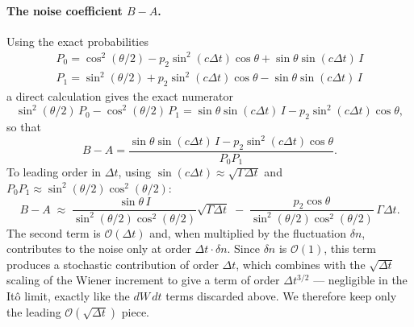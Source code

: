 \documentclass[a4paper,12pt]{article}
\begin{document}
\paragraph{The noise coefficient $B-A$.}
Using the exact probabilities
\begin{gather*}
	P_{0} = \cos^{2}(\theta/2) - p_{2}\sin^{2}(c\Delta t)\cos\theta + \sin\theta\sin(c\Delta t)\, I \\
	P_{1} = \sin^{2}(\theta/2) + p_{2}\sin^{2}(c\Delta t)\cos\theta - \sin\theta\sin(c\Delta t)\, I
\end{gather*}
a direct calculation gives the exact numerator
\begin{equation}
	\sin^{2}(\theta/2)\,P_{0} - \cos^{2}(\theta/2)\,P_{1} = \sin\theta\sin(c\Delta t)\, I - p_{2}\sin^{2}(c\Delta t)\cos\theta ,
\end{equation}
so that
\begin{equation}
	B - A = \frac{\sin\theta\sin(c\Delta t)\, I - p_{2}\sin^{2}(c\Delta t)\cos\theta}{P_{0}P_{1}} .
\end{equation}
To leading order in $\Delta t$, using $\sin(c\Delta t)\approx\sqrt{\Gamma\Delta t}$ and $P_{0}P_{1}\approx \sin^{2}(\theta/2)\cos^{2}(\theta/2)$:
\begin{equation}
	B - A \;\approx\; \frac{\sin\theta\, I}{\sin^{2}(\theta/2)\cos^{2}(\theta/2)}\sqrt{\Gamma\Delta t} \;-\; \frac{p_{2}\cos\theta}{\sin^{2}(\theta/2)\cos^{2}(\theta/2)}\,\Gamma\Delta t .
	\label{eq:general_BA}
\end{equation}
The second term is $\mathcal{O}(\Delta t)$ and, when multiplied by the fluctuation $\delta n$, contributes to the noise only at order $\Delta t \cdot \delta n$. Since $\delta n$ is $\mathcal{O}(1)$, this term produces a stochastic contribution of order $\Delta t$, which combines with the $\sqrt{\Delta t}$ scaling of the Wiener increment to give a term of order $\Delta t^{3/2}$ — negligible in the Itô limit, exactly like the $dW\, dt$ terms discarded above. We therefore keep only the leading $\mathcal{O}(\sqrt{\Delta t})$ piece.
\end{document}
